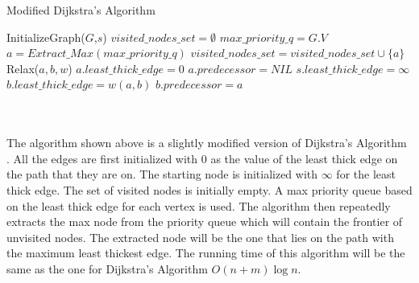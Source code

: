 \documentclass[addpoints]{exam}
\begin{document}
\begin{questions}
\begin{minipage}{\linewidth}
  \begin{algorithm}[H]
    \caption{Modified Dijkstra's Algorithm}\label{Djk}
    \begin{algorithmic}[1]
      	\State InitializeGraph($G$,$s$)
	\State $visited\_nodes\_set =\emptyset$
	\State $max\_priority\_q = G.V$ 
		\State $a=Extract\_Max(max\_priority\_q)$
		\State $visited\_nodes\_set =  visited\_nodes\_set \cup \{a\}$
			\State Relax($a, b, w$)
		\EndFor
	\EndWhile
      \EndProcedure    
		\State $a.least\_thick\_edge = 0$
		\State $a.predecessor = NIL$
	\EndFor
	\State $s.least\_thick\_edge =\infty$
      \EndProcedure
		\State $b.least\_thick\_edge = w(a,b)$
		\State $b.predecessor = a$
	\EndIf
      \EndProcedure    
     \end{algorithmic}
  \end{algorithm}
\end{minipage}\\\\

The algorithm shown above is a slightly modified version of Dijkstra's Algorithm \cite{CLRS}. All the edges are first initialized with $0$ as the value of the least thick edge on the path that they are on. The starting node is initialized with $\infty$ for the least thick edge. The set of visited nodes is initially empty. A max priority queue based on the least thick edge for each vertex is used. The algorithm then repeatedly extracts the max node from the priority queue which will contain the frontier of unvisited nodes. The extracted node will be the one that lies on the path with the maximum least thickest edge. The running time of this algorithm will be the same \cite{CLRS} as the one for Dijkstra's Algorithm $O(n+m)\log n$.


\end{questions}
\end{document}
